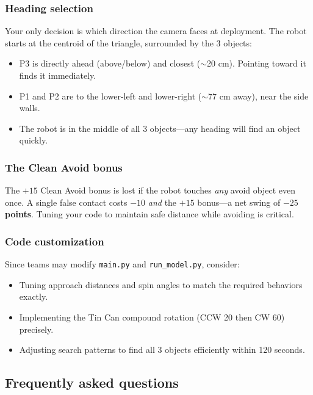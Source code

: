 \documentclass[a4]{article}
\begin{document}
\subsubsection*{Heading selection}

Your only decision is which direction the camera faces at deployment. The robot starts at the centroid of the triangle, surrounded by the 3 objects:
\begin{itemize}
    \item P3 is directly ahead (above/below) and closest ($\sim$20 cm). Pointing toward it finds it immediately.
    \item P1 and P2 are to the lower-left and lower-right ($\sim$77 cm away), near the side walls.
    \item The robot is in the middle of all 3 objects---any heading will find an object quickly.
\end{itemize}

\subsubsection*{The Clean Avoid bonus}

The $+15$ Clean Avoid bonus is lost if the robot touches \textit{any} avoid object even once. A single false contact costs $-10$ \textit{and} the $+15$ bonus---a net swing of \textbf{$-25$ points}. Tuning your code to maintain safe distance while avoiding is critical.

\subsubsection*{Code customization}

Since teams may modify \texttt{main.py} and \texttt{run\_model.py}, consider:
\begin{itemize}
    \item Tuning approach distances and spin angles to match the required behaviors exactly.
    \item Implementing the Tin Can compound rotation (CCW 20\textdegree{} then CW 60\textdegree) precisely.
    \item Adjusting search patterns to find all 3 objects efficiently within 120 seconds.
\end{itemize}

\pagebreak
\subsection*{Frequently asked questions}
\end{document}
